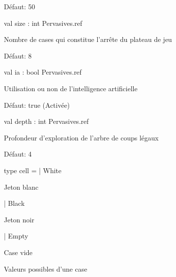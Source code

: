 \documentclass[11pt]{article}
\begin{document}
Défaut: 50



\label{val:Othello.size}\begin{ocamldoccode}
val size : int Pervasives.ref
\end{ocamldoccode}
\begin{ocamldocdescription}
Nombre de cases qui constitue l'arrête du plateau de jeu


\end{ocamldocdescription}




Défaut: 8



\label{val:Othello.ia}\begin{ocamldoccode}
val ia : bool Pervasives.ref
\end{ocamldoccode}
\begin{ocamldocdescription}
Utilisation ou non de l'intelligence artificielle


\end{ocamldocdescription}




Défaut: true (Activée)



\label{val:Othello.depth}\begin{ocamldoccode}
val depth : int Pervasives.ref
\end{ocamldoccode}
\begin{ocamldocdescription}
Profondeur d'exploration de l'arbre de coups légaux


\end{ocamldocdescription}




Défaut: 4



\label{type:Othello.cell}\begin{ocamldoccode}
type cell =
  | White
\end{ocamldoccode}
\begin{ocamldoccomment}
Jeton blanc
\end{ocamldoccomment}
\begin{ocamldoccode}
  | Black
\end{ocamldoccode}
\begin{ocamldoccomment}
Jeton noir
\end{ocamldoccomment}
\begin{ocamldoccode}
  | Empty
\end{ocamldoccode}
\begin{ocamldoccomment}
Case vide
\end{ocamldoccomment}
\begin{ocamldocdescription}
Valeurs possibles d'une case


\end{ocamldocdescription}
\end{document}

